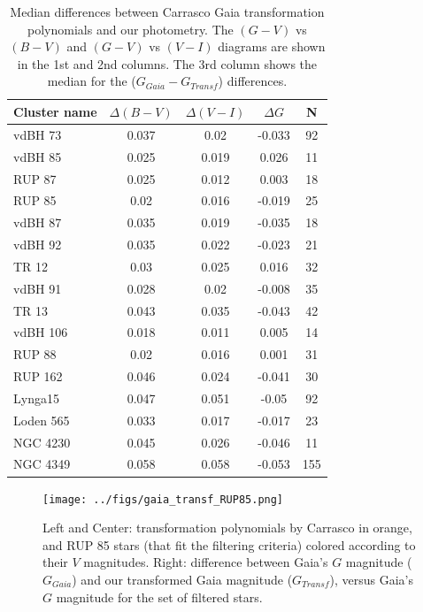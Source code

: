 \documentclass[draft]{aa}
\begin{document}
\begin{table}[ht]
    \centering
    \begin{tabular}{lcccc}
    \hline
    Cluster name & $\Delta (B-V)$ & $\Delta (V-I)$& $\Delta G$ & N \\
    \hline \hline
    vdBH 73 &  0.037 & 0.02 &  -0.033 &  92 \\
    vdBH 85  &  0.025 & 0.019 & 0.026 &  11\\
    RUP 87 & 0.025 & 0.012 & 0.003 &  18\\
    RUP 85 & 0.02 &  0.016 & -0.019 &   25\\
    vdBH 87 &  0.035 & 0.019 & -0.035 &   18\\
    vdBH 92 &  0.035 & 0.022 & -0.023 &   21\\
    TR 12 &  0.03 &  0.025 & 0.016 &  32\\
    vdBH 91 &  0.028 & 0.02 &  -0.008 &   35\\
    TR 13 &  0.043 & 0.035 & -0.043 &   42\\
    vdBH 106 & 0.018 & 0.011 & 0.005 &  14\\
    RUP 88 & 0.02 &  0.016 & 0.001 &  31\\
    RUP 162 &  0.046 & 0.024 & -0.041 &   30\\
    Lynga15 &  0.047 & 0.051 & -0.05 &  92\\
    Loden 565 &  0.033 & 0.017 & -0.017 &   23\\
    NGC 4230 & 0.045 & 0.026 & -0.046 &   11\\
    NGC 4349 & 0.058 & 0.058 & -0.053 & 155\\
    \hline
    \end{tabular}
    \caption{Median differences between Carrasco Gaia transformation
polynomials and our photometry. The $(G-V)$ vs $(B-V)$ and $(G-V)$ vs
$(V-I)$ diagrams are shown in the 1st and 2nd columns. The 3rd column
shows the median for the ($G_{Gaia}-G_{Transf}$) differences.}
    \label{tab:gaia_diffs}
\end{table}

\begin{figure}[ht]
    \centering
     \texttt{[image: ../figs/gaia\_transf\_RUP85.png]}   
     \caption{Left and Center: transformation polynomials by Carrasco in
orange, and RUP 85 stars (that fit the filtering criteria) colored according to
their $V$ magnitudes. Right: difference between Gaia's $G$ magnitude
($G_{Gaia}$) and our transformed Gaia magnitude ($G_{Transf}$), versus
Gaia's $G$ magnitude for the set of filtered stars.}
    \label{fig:gaia_transf}
\end{figure}
\end{document}
